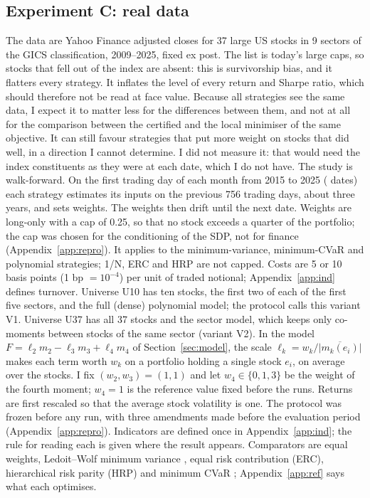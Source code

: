 \documentclass[11pt,a4paper]{article}
\begin{document}
\subsection{Experiment C: real data}\label{sec:C}
The data are Yahoo Finance adjusted closes for 37 large US stocks in 9 sectors of the GICS classification, 2009--2025, fixed ex post.
The list is today's large caps, so stocks that fell out of the index are absent: this is survivorship bias, and it flatters every strategy.
It inflates the level of every return and Sharpe ratio, which should therefore not be read at face value.
Because all strategies see the same data, I expect it to matter less for the differences between them, and not at all for the comparison between the certified and the local minimiser of the same objective.
It can still favour strategies that put more weight on stocks that did well, in a direction I cannot determine.
I did not measure it: that would need the index constituents as they were at each date, which I do not have.
The study is walk-forward.
On the first trading day of each month from 2015 to 2025 (\cDates{} dates) each strategy estimates its inputs on the previous 756 trading days, about three years, and sets weights.
The weights then drift until the next date.
Weights are long-only with a cap of 0.25, so that no stock exceeds a quarter of the portfolio; the cap was chosen for the conditioning of the SDP, not for finance (Appendix~\ref{app:repro}).
It applies to the minimum-variance, minimum-CVaR and polynomial strategies; 1/N, ERC and HRP are not capped.
Costs are 5 or 10 basis points (1 bp $=10^{-4}$) per unit of traded notional; Appendix~\ref{app:ind} defines turnover.
Universe U10 has ten stocks, the first two of each of the first five sectors, and the full (dense) polynomial model; the protocol calls this variant V1.
Universe U37 has all 37 stocks and the sector model, which keeps only co-moments between stocks of the same sector (variant V2).
In the model $F=\ell_2m_2-\ell_3m_3+\ell_4m_4$ of Section~\ref{sec:model}, the scale $\ell_k=w_k/\overline{|m_k(e_i)|}$ makes each term worth $w_k$ on a portfolio holding a single stock $e_i$, on average over the stocks.
I fix $(w_2,w_3)=(1,1)$ and let $w_4\in\{0,1,3\}$ be the weight of the fourth moment; $w_4=1$ is the reference value fixed before the runs.
Returns are first rescaled so that the average stock volatility is one.
The protocol was frozen before any run, with three amendments made before the evaluation period (Appendix~\ref{app:repro}).
Indicators are defined once in Appendix~\ref{app:ind}; the rule for reading each is given where the result appears.
Comparators are equal weights, Ledoit--Wolf minimum variance \cite{ledoit2004}, equal risk contribution (ERC), hierarchical risk parity (HRP) \cite{lopezdeprado2016} and minimum CVaR \cite{rockafellar2000}; Appendix~\ref{app:ref} says what each optimises.
\end{document}
